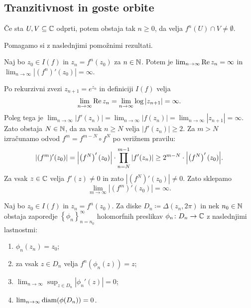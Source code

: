 \subsection{Tranzitivnost in goste orbite} \label{sec:transitivity}

\begin{izrek} \label{thm:transitivity}
    Če sta \(U, V \subseteq \mathbb C\) odprti, potem obstaja tak \(n \geq 0\), da velja \(f^{n} (U) \cap V \neq \emptyset\).
\end{izrek}

\noindent Pomagamo si z naslednjimi pomožnimi rezultati.

\begin{trditev}
    Naj bo \(z_0 \in I (f)\) in \(z_n = f^n (z_0)\) za \(n \in \mathbb N\). Potem je \(\lim_{n \to \infty} \operatorname{Re} z_n = \infty\) in \(\lim_{n \to \infty} |(f^n)' (z_0)| = \infty\).
\end{trditev}

\begin{dokaz}
    Po rekurzivni zvezi \(z_{n + 1} = e^{z_n}\) in definiciji \(I (f)\) velja
    \[\lim_{n \to \infty} \operatorname{Re} z_n = \lim_{n \to \infty} \log |z_{n + 1}| = \infty.\]
    Poleg tega je \(\lim_{n \to \infty} |f' (z_n)| = \lim_{n \to \infty} |f (z_n)| = \lim_{n \to \infty} |z_{n + 1}| = \infty\). Zato obstaja \(N \in \mathbb N\), da za vsak \(n \geq N\) velja \(|f' (z_n)| \geq 2\). Za \(m > N\) izračunamo odvod \(f^{m} = f^{m - N} \circ f^{N}\) po verižnem pravilu:
    \[|(f^{m})' (z_0)| = \abs{ \prt{f^{N}}' (z_0) } \cdot \prod_{n = N}^{m - 1} |f' (z_n)| \geq 2^{m - N} \cdot \abs{ \prt{f^{N}}' (z_0) }.\]
    Za vsak \(z \in \mathbb C\) velja \(f' (z) \neq 0\) in zato \(|(f^N)' (z_0)| \neq 0\). Zato sklepamo
    \[\lim_{m \to \infty} |(f^{m})' (z_0)| = \infty.\]
\end{dokaz}

\begin{trditev} \label{prop:small_disks}
    Naj bo \(z_0 \in I (f)\) in \(z_n = f^{n} (z_0)\). Za diske \(D_n \coloneq \Delta (z_n, 2 \pi)\) in nek \(n_0 \in \mathbb N\) obstaja zaporedje \(\left\{ \phi_n \right\}_{n = n_0}^{\infty}\) holomorfnih preslikav \(\phi_n \colon D_n \to \mathbb C\) z naslednjimi lastnostmi:
    \begin{enumerate}
        \item \label{item:ena} \(\phi_n (z_n) = z_0\);
        \item \label{item:dva} za vsak \(z \in D_n\) velja \(f^n (\phi_n (z)) = z\);
        \item \label{item:tri} \(\lim_{n \to \infty} \sup_{z \in D_n} |\phi_n' (z)| = 0\);
        \item \label{item:stiri} \(\lim_{n \to \infty} \operatorname{diam} (\phi (D_n)) = 0\).
    \end{enumerate}
\end{trditev}

